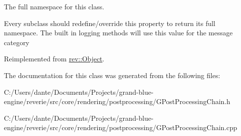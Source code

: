 The full namespace for this class. 

Every subclass should redefine/override this property to return its full namespace. The built in logging methods will use this value for the message category 

Reimplemented from \mbox{\hyperlink{classrev_1_1_object_aaeb638d3e10f361c56c211a318a27f3d}{rev\+::\+Object}}.



The documentation for this class was generated from the following files\+:\begin{DoxyCompactItemize}
\item 
C\+:/\+Users/dante/\+Documents/\+Projects/grand-\/blue-\/engine/reverie/src/core/rendering/postprocessing/G\+Post\+Processing\+Chain.\+h\item 
C\+:/\+Users/dante/\+Documents/\+Projects/grand-\/blue-\/engine/reverie/src/core/rendering/postprocessing/G\+Post\+Processing\+Chain.\+cpp\end{DoxyCompactItemize}
